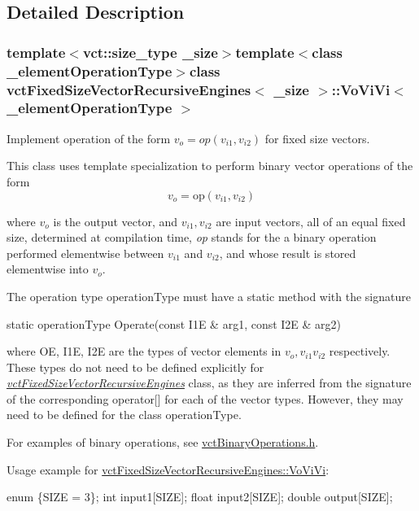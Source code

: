 \subsection{Detailed Description}
\subsubsection*{template$<$vct\-::size\-\_\-type \-\_\-size$>$template$<$class \-\_\-element\-Operation\-Type$>$class vct\-Fixed\-Size\-Vector\-Recursive\-Engines$<$ \-\_\-size $>$\-::\-Vo\-Vi\-Vi$<$ \-\_\-element\-Operation\-Type $>$}

Implement operation of the form $v_o = op(v_{i1}, v_{i2})$ for fixed size vectors. 

This class uses template specialization to perform binary vector operations of the form \[ v_o = \mathrm{op}(v_{i1}, v_{i2}) \]

where $v_o$ is the output vector, and $v_{i1}, v_{i2}$ are input vectors, all of an equal fixed size, determined at compilation time, {\itshape op} stands for the a binary operation performed elementwise between $v_{i1}$ and $v_{i2}$, and whose result is stored elementwise into $v_o$.

The operation type operation\-Type must have a static method with the signature


\begin{DoxyPre}
static operationType Operate(const I1E & arg1, const I2E & arg2)
\end{DoxyPre}


where O\-E, I1\-E, I2\-E are the types of vector elements in $v_o, v_{i1} v_{i2}$ respectively. These types do not need to be defined explicitly for {\itshape \hyperlink{classvct_fixed_size_vector_recursive_engines}{vct\-Fixed\-Size\-Vector\-Recursive\-Engines}} class, as they are inferred from the signature of the corresponding operator\mbox{[}\mbox{]} for each of the vector types. However, they may need to be defined for the class operation\-Type.

For examples of binary operations, see \hyperlink{vct_binary_operations_8h}{vct\-Binary\-Operations.\-h}.

Usage example for \hyperlink{classvct_fixed_size_vector_recursive_engines_1_1_vo_vi_vi}{vct\-Fixed\-Size\-Vector\-Recursive\-Engines\-::\-Vo\-Vi\-Vi}\-: 
\begin{DoxyPre}
enum \{SIZE = 3\};
int input1[SIZE];
float input2[SIZE];
double output[SIZE];\end{DoxyPre}



